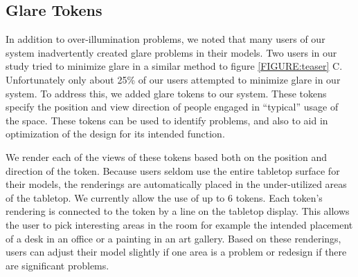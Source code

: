 \documentclass[10pt,twocolumn,letterpaper]{article}
\begin{document}
\subsection{Glare Tokens}


In addition to over-illumination problems, we noted that many users of
our system inadvertently created glare problems in their models.   Two
users in our study tried to minimize glare in a similar method to
figure \ref{FIGURE:teaser} C.  Unfortunately only about 25\% of
our users attempted to minimize glare in our system.  
To address this, we added glare tokens to our system.  
%
These tokens specify the position and view direction of people engaged
in ``typical'' usage of the space.  These tokens can be used to
identify problems, and also to aid in optimization of the design for
its intended function.
%
%

We render each of the views of these tokens based both on the position
and direction of the token.  Because users seldom use the entire
tabletop surface for their models, the renderings are automatically
placed in the under-utilized areas of the tabletop.  We currently
allow the use of up to 6 tokens.  Each token's rendering is connected
to the token by a line on the tabletop display.  This allows the user
to pick interesting areas in the room for example the intended
placement of a desk in an office or a painting in an art gallery.
Based on these renderings, users can adjust their model slightly if
one area is a problem or redesign if there are significant problems.
\end{document}
